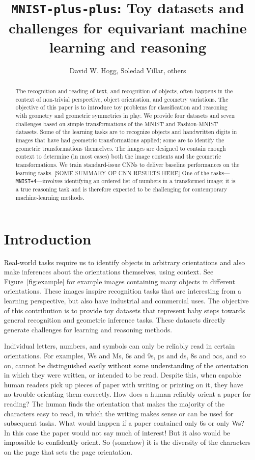 \documentclass{article}
\title{\bfseries \texttt{MNIST-plus-plus}: Toy datasets and challenges for equivariant machine learning and reasoning}
\author{David W. Hogg,  Soledad Villar, others}
\date{}
\begin{document}
\maketitle\thispagestyle{empty}

\begin{abstract}\noindent
    The recognition and reading of text, and recognition of objects, often happens in the context of non-trivial perspective, object orientation, and geometry variations.
    The objective of this paper is to introduce toy problems for classification and reasoning with geometry and geometric symmetries in play.
    We provide four datasets and seven challenges based on simple transformations of the MNIST and Fashion-MNIST datasets.
    Some of the learning tasks are to recognize objects and handwritten digits in images that have had geometric transformations applied; some are to identify the geometric transformations themselves.
    The images are designed to contain enough context to determine (in most cases) both the image contents and the geometric transformations.
    We train standard-issue CNNs to deliver baseline performances on the learning tasks.
    [SOME SUMMARY OF CNN RESULTS HERE]
    One of the tasks---\texttt{MNIST+4}---involves identifying an ordered list of numbers in a transformed image; it is a true reasoning task and is therefore expected to be challenging for contemporary machine-learning methods.
\end{abstract}

\section{Introduction}

Real-world tasks require us to identify objects in arbitrary orientations and also make inferences about the orientations themselves, using context. 
See Figure~\ref{fig:example} for example images containing many objects in different orientations.
These images inspire recognition tasks that are interesting from a learning perspective, but also have industrial and commercial uses.
The objective of this contribution is to provide toy datasets that represent baby steps towards general recognition and geometric inference tasks.
These datasets directly generate challenges for learning and reasoning methods.

Individual letters, numbers, and symbols can only be reliably read in certain orientations.
For examples, Ws and Ms, 6s and 9s, ps and ds, 8s and $\infty$s, and so on, cannot be distinguished easily without some understanding of the orientation in which they were written, or intended to be read.
Despite this, when capable human readers pick up pieces of paper with writing or printing on it, they have no trouble orienting them correctly.
How does a human reliably orient a paper for reading?
The human finds the orientation that makes the majority of the characters easy to read, in which the writing makes sense or can be used for subsequent tasks.
What would happen if a paper contained only 6s or only Ws?
In this case the paper would not say much of interest!
But it also would be impossible to confidently orient.
So (somehow) it is the diversity of the characters on the page that sets the page orientation.
\end{document}
